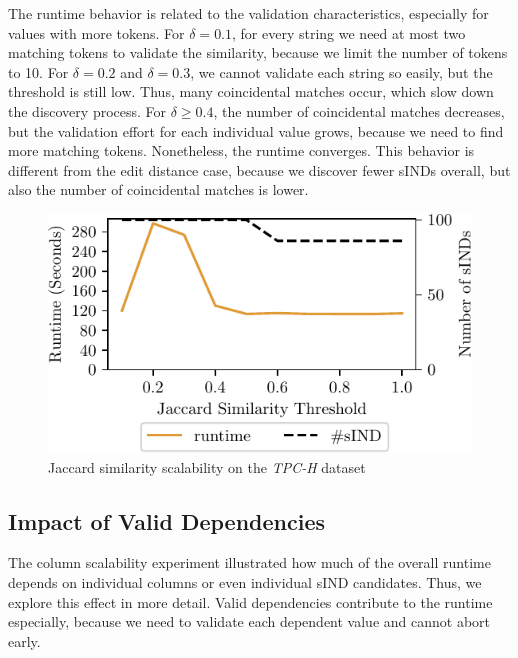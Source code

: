 The runtime behavior is related to the validation characteristics, especially for values with more tokens.
For $\delta = 0.1$, for every string we need at most two matching tokens to validate the similarity, because we limit the number of tokens to 10.
For $\delta = 0.2$ and $\delta = 0.3$, we cannot validate each string so easily, but the threshold is still low.
Thus, many coincidental matches occur, which slow down the discovery process.
For $\delta \geq 0.4$, the number of coincidental matches decreases, but the validation effort for each individual value grows, because we need to find more matching tokens.
Nonetheless, the runtime converges.
This behavior is different from the edit distance case, because we discover fewer sINDs overall, but also the number of coincidental matches is lower.
\begin{figure}[ht]
    \centering
    \includegraphics[width=.55\textwidth]{figures/evaluation/sim_scaling_TPCH_token-crop.pdf}
    \caption{Jaccard similarity scalability on the \emph{TPC-H} dataset}
    \label{fig:eval:jac_sim_scalability}
\end{figure}

\subsection{Impact of Valid Dependencies}
\label{subsection:evaluation:valid_impact}
The column scalability experiment illustrated how much of the overall runtime depends on individual columns or even individual sIND candidates.
Thus, we explore this effect in more detail.
Valid dependencies contribute to the runtime especially, because we need to validate each dependent value and cannot abort early.

